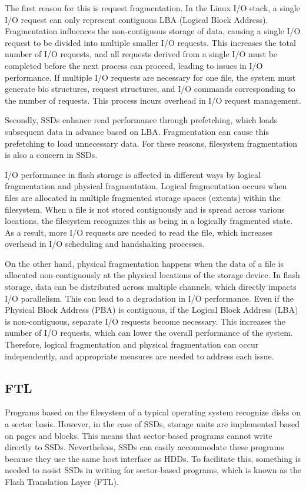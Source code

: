 The first reason for this is request fragmentation.
In the Linux I/O stack, a single I/O request can only represent contiguous LBA (Logical Block Address). 
Fragmentation influences the non-contiguous storage of data, causing a single I/O request to be divided into multiple smaller I/O requests. 
This increases the total number of I/O requests, and all requests derived from a single I/O must be completed before the next process can proceed, leading to issues in I/O performance.
If multiple I/O requests are necessary for one file, the system must generate bio structures, request structures, and I/O commands corresponding to the number of requests. This process incurs overhead in I/O request management.

Secondly, SSDs enhance read performance through prefetching, which loads subsequent data in advance based on LBA. 
Fragmentation can cause this prefetching to load unnecessary data. For these reasons, filesystem fragmentation is also a concern in SSDs.

 I/O performance in flash storage is affected in different ways by logical fragmentation and physical fragmentation.\cite{Logical_Fragmentation_vs_physical_Fragmentation}
Logical fragmentation occurs when files are allocated in multiple fragmented storage spaces (extents) within the filesystem.
When a file is not stored contiguously and is spread across various locations, the filesystem recognizes this as being in a logically fragmented state. 
As a result, more I/O requests are needed to read the file, which increases overhead in I/O scheduling and handshaking processes.

On the other hand, physical fragmentation happens when the data of a file is allocated non-contiguously at the physical locations of the storage device.
In flash storage, data can be distributed across multiple channels, which directly impacts I/O parallelism. 
This can lead to a degradation in I/O performance. 
Even if the Physical Block Address (PBA) is contiguous, if the Logical Block Address (LBA) is non-contiguous, separate I/O requests become necessary. 
This increases the number of I/O requests, which can lower the overall performance of the system.
Therefore, logical fragmentation and physical fragmentation can occur independently, and appropriate measures are needed to address each issue.

\subsection{FTL}
Programs based on the filesystem of a typical operating system recognize disks on a sector basis.
However, in the case of SSDs, storage units are implemented based on pages and blocks.
This means that sector-based programs cannot write directly to SSDs. 
Nevertheless, SSDs can easily accommodate these programs because they use the same host interface as HDDs.
To facilitate this, something is needed to assist SSDs in writing for sector-based programs, which is known as the Flash Translation Layer (FTL).

